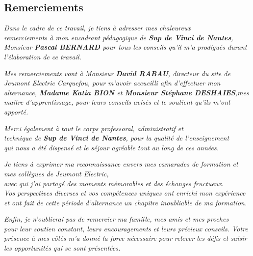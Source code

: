 \documentclass[11pt,a4paper]{article}
\begin{document}
\newpage
\begin{center}
\Large
\section*{Remerciements}
\textit{
Dans le cadre de ce travail, je tiens à adresser mes chaleureux\\
remerciements à mon encadrant pédagogique de \textbf{Sup de Vinci de Nantes}, Monsieur} \textit{ \textbf{Pascal BERNARD} pour tous les conseils qu’il m’a prodigués durant l’élaboration de ce travail.\\[1em]}

\textit{Mes remerciements vont à Monsieur \textbf{David RABAU}, directeur du site de \textit{Jeumont Electric Carquefou}, pour m’avoir accueilli afin d'effectuer mon alternance, \textbf{Madame Katia BION} et \textbf{Monsieur Stéphane DESHAIES},mes maitre d'apprentissage, pour leurs conseils avisés et le soutient qu’ils m’ont apporté.\\[1em]}

\textit{Merci également à tout le corps professoral, administratif et\\
technique de \textbf{Sup de Vinci de Nantes}, pour la qualité de l’enseignement\\
qui nous a été dispensé et le séjour agréable tout au long de ces années.\\[1em]}

\textit{Je tiens à exprimer ma reconnaissance envers mes camarades de formation et mes collègues de Jeumont Electric,\\
avec qui j’ai partagé des moments mémorables et des échanges fructueux.\\
Vos perspectives diverses et vos compétences uniques ont enrichi mon expérience
et ont fait de cette période d’alternance un chapitre inoubliable de ma formation.\\[1em]}

\textit{Enfin, je n’oublierai pas de remercier ma famille, mes amis et mes proches\\
pour leur soutien constant, leurs encouragements et leurs précieux conseils.
Votre présence à mes côtés m’a donné la force nécessaire pour relever les défis
et saisir les opportunités qui se sont présentées.}
\end{center}

\newpage
\end{document}
